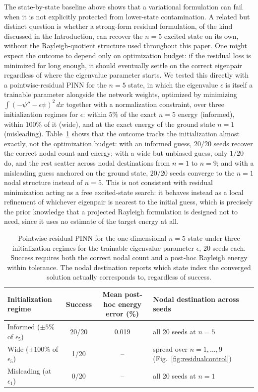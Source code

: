 \documentclass[10pt,onecolumn]{article}
\begin{document}
The state-by-state baseline above shows that a variational formulation can fail when it is not explicitly protected from lower-state contamination. A related but distinct question is whether a strong-form residual formulation, of the kind discussed in the Introduction, can recover the $n=5$ excited state on its own, without the Rayleigh-quotient structure used throughout this paper. One might expect the outcome to depend only on optimization budget: if the residual loss is minimized for long enough, it should eventually settle on the correct eigenpair regardless of where the eigenvalue parameter starts. We tested this directly with a pointwise-residual PINN for the $n=5$ state, in which the eigenvalue $\epsilon$ is itself a trainable parameter alongside the network weights, optimized by minimizing $\int(-\psi''-\epsilon\psi)^2\,dx$ together with a normalization constraint, over three initialization regimes for $\epsilon$: within $5\%$ of the exact $n=5$ energy (informed), within $100\%$ of it (wide), and at the exact energy of the ground state $n=1$ (misleading). Table~\ref{tab:residualcontrol} shows that the outcome tracks the initialization almost exactly, not the optimization budget: with an informed guess, $20/20$ seeds recover the correct nodal count and energy; with a wide but unbiased guess, only $1/20$ do, and the rest scatter across nodal destinations from $n=1$ to $n=9$; and with a misleading guess anchored on the ground state, $20/20$ seeds converge to the $n=1$ nodal structure instead of $n=5$. This is not consistent with residual minimization acting as a free excited-state search: it behaves instead as a local refinement of whichever eigenpair is nearest to the initial guess, which is precisely the prior knowledge that a projected Rayleigh formulation is designed not to need, since it uses no estimate of the target energy at all.

\begin{table}[!htbp]
\centering
\caption{Pointwise-residual PINN for the one-dimensional $n=5$ state under three initialization regimes for the trainable eigenvalue parameter $\epsilon$, 20 seeds each. Success requires both the correct nodal count and a post-hoc Rayleigh energy within tolerance. The nodal destination reports which state index the converged solution actually corresponds to, regardless of success.}
\label{tab:residualcontrol}
\small
\begin{tabularx}{\textwidth}{@{} l c c >{\raggedright\arraybackslash}X @{}}
\toprule
Initialization regime & Success & Mean post-hoc energy error (\%) & Nodal destination across seeds \\
\midrule
Informed ($\pm5\%$ of $\epsilon_5$) & 20/20 & 0.019 & all 20 seeds at $n=5$ \\
Wide ($\pm100\%$ of $\epsilon_5$) & 1/20 & -- & spread over $n=1,\ldots,9$ (Fig.~\ref{fig:residualcontrol}) \\
Misleading (at $\epsilon_1$) & 0/20 & -- & all 20 seeds at $n=1$ \\
\bottomrule
\end{tabularx}
\end{table}
\FloatBarrier
\end{document}
